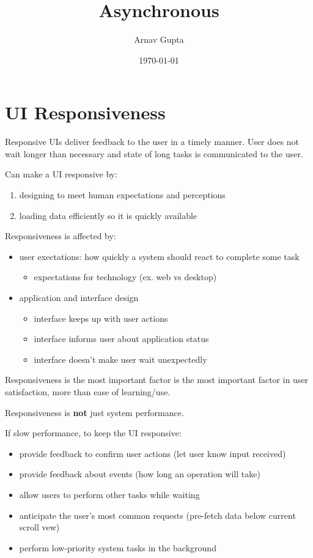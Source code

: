 \documentclass[11pt]{article}
\author{Arnav Gupta}
\date{\today}
\title{Asynchronous}
\begin{document}
\maketitle
\tableofcontents

\section{UI Responsiveness}
\label{sec:orgbfa1633}
Responsive UIs deliver feedback to the user in a timely manner.
User does not wait longer than necessary and state of long tasks is communicated to the user.

Can make a UI responsive by:
\begin{enumerate}
\item designing to meet human expectations and perceptions
\item loading data efficiently so it is quickly available
\end{enumerate}

Responsiveness is affected by:
\begin{itemize}
\item user exectations: how quickly a system should react to complete some task
\begin{itemize}
\item expectations for technology (ex. web vs desktop)
\end{itemize}
\item application and interface design
\begin{itemize}
\item interface keeps up with user actions
\item interface informs user about application status
\item interface doesn't make user wait unexpectedly
\end{itemize}
\end{itemize}

Responsiveness is the most important factor is the most important factor in user satisfaction, more than
ease of learning/use.

Responsiveness is \textbf{not} just system performance.

If slow performance, to keep the UI responsive:
\begin{itemize}
\item provide feedback to confirm user actions (let user know input received)
\item provide feedback about events (how long an operation will take)
\item allow users to perform other tasks while waiting
\item anticipate the user's most common requests (pre-fetch data below current scroll vew)
\item perform low-priority system tasks in the background
\end{itemize}
\end{document}
